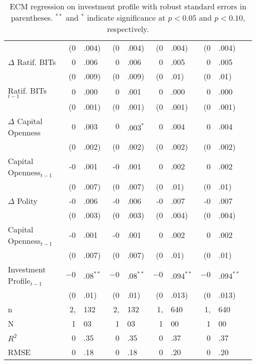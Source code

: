 \begin{table}[ht]
{\begin{tabular}{lr@{} lr@{}lr@{}lr@{}lr@{}}
   & (0&.004) & (0&.004) & (0&.004) & (0&.004) \\ 
  $\Delta$ Ratif. BITs & 0&.006 & 0&.006 & 0&.005 & 0&.005 \\ 
   & (0&.009) & (0&.009) & (0&.01) & (0&.01) \\ 
  Ratif. BITs$_{t-1}$ & 0&.000 & 0&.001 & 0&.000 & 0&.000 \\ 
   & (0&.001) & (0&.001) & (0&.001) & (0&.001) \\ 
  $\Delta$ Capital Openness & 0&.003 & $0$&$.003^{\ast}$ & 0&.004 & 0&.004 \\ 
   & (0&.002) & (0&.002) & (0&.002) & (0&.002) \\ 
  Capital Openness$_{t-1}$ & -0&.001 & -0&.001 & 0&.002 & 0&.002 \\ 
   & (0&.007) & (0&.007) & (0&.01) & (0&.01) \\ 
  $\Delta$ Polity & -0&.006 & -0&.006 & -0&.007 & -0&.007 \\ 
   & (0&.003) & (0&.003) & (0&.004) & (0&.004) \\ 
  Capital Openness$_{t-1}$ & -0&.001 & -0&.001 & 0&.002 & 0&.002 \\ 
   & (0&.007) & (0&.007) & (0&.01) & (0&.01) \\ 
  Investment Profile$_{t-1}$ & $-0$&$.08^{\ast\ast}$ & $-0$&$.08^{\ast\ast}$ & $-0$&$.094^{\ast\ast}$ & $-0$&$.094^{\ast\ast}$ \\ 
   & (0&.01) & (0&.01) & (0&.013) & (0&.013) \\ 
   \hline
n & 2,&132 & 2,&132 & 1,&640 & 1,&640 \\ 
  N & 1&03 & 1&03 & 1&00 & 1&00 \\ 
  $R^{2}$ & 0&.35 & 0&.35 & 0&.37 & 0&.37 \\ 
  RMSE & 0&.18 & 0&.18 & 0&.20 & 0&.20 \\ 
   \hline
\hline
\end{tabular}
}
\caption{ECM regression on investment profile with robust standard errors in parentheses. $^{**}$ and $^{*}$ indicate significance at $p< 0.05 $ and $p< 0.10 $, respectively.} 
\end{table}